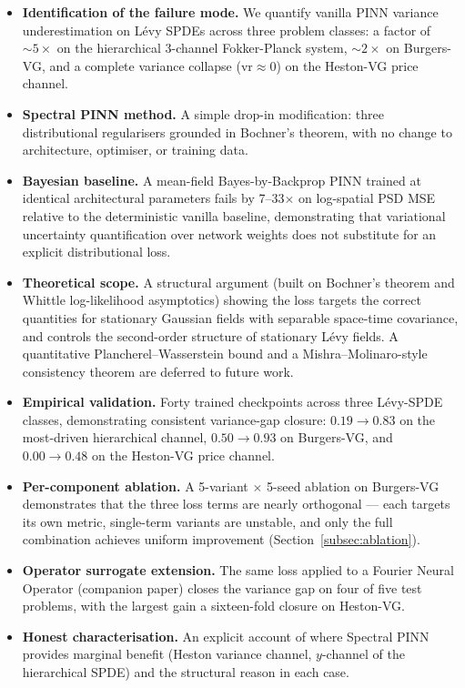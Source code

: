 \documentclass[review,12pt]{elsarticle}
\begin{document}
\begin{itemize}
\item \textbf{Identification of the failure mode.} We quantify vanilla
PINN variance underestimation on L\'evy SPDEs across three problem
classes: a factor of \(\sim 5\times\) on the hierarchical 3-channel
Fokker-Planck system, \(\sim 2\times\) on Burgers-VG, and a complete
variance collapse (\(\mathrm{vr} \approx 0\)) on the Heston-VG price
channel.

\item \textbf{Spectral PINN method.} A simple drop-in modification:
three distributional regularisers grounded in Bochner's theorem, with
no change to architecture, optimiser, or training data.

\item \textbf{Bayesian baseline.} A mean-field Bayes-by-Backprop PINN
trained at identical architectural parameters fails by 7--33\(\times\)
on log-spatial PSD MSE relative to the deterministic vanilla
baseline, demonstrating that variational uncertainty quantification
over network weights does not substitute for an explicit
distributional loss.

\item \textbf{Theoretical scope.} A structural argument (built on
Bochner's theorem and Whittle log-likelihood asymptotics) showing the
loss targets the correct quantities for stationary Gaussian fields
with separable space-time covariance, and controls the second-order
structure of stationary L\'evy fields. A quantitative
Plancherel--Wasserstein bound and a Mishra--Molinaro-style
consistency theorem are deferred to future work.

\item \textbf{Empirical validation.} Forty trained checkpoints across
three L\'evy-SPDE classes, demonstrating consistent variance-gap
closure: \(0.19 \to 0.83\) on the most-driven hierarchical channel,
\(0.50 \to 0.93\) on Burgers-VG, and \(0.00 \to 0.48\) on the
Heston-VG price channel.

\item \textbf{Per-component ablation.} A 5-variant \(\times\) 5-seed
ablation on Burgers-VG demonstrates that the three loss terms are
nearly orthogonal --- each targets its own metric, single-term
variants are unstable, and only the full combination achieves
uniform improvement (Section~\ref{subsec:ablation}).

\item \textbf{Operator surrogate extension.} The same loss applied to a
Fourier Neural Operator (companion paper) closes the variance gap on
four of five test problems, with the largest gain a sixteen-fold
closure on Heston-VG.

\item \textbf{Honest characterisation.} An explicit account of where
Spectral PINN provides marginal benefit (Heston variance channel,
\(y\)-channel of the hierarchical SPDE) and the structural reason in
each case.
\end{itemize}
\end{document}
